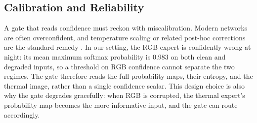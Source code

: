 \subsection{Calibration and Reliability}

A gate that reads confidence must reckon with miscalibration. Modern networks are
often overconfident, and temperature scaling or related post-hoc corrections are the
standard remedy \cite{guo2017calibration}. In our setting, the RGB expert is
confidently wrong at night: its mean maximum softmax probability is 0.983 on both clean
and degraded inputs, so a threshold on RGB confidence cannot separate the two regimes.
The gate therefore reads the full probability maps, their entropy, and the thermal
image, rather than a single confidence scalar. This design choice is also why the gate
degrades gracefully: when RGB is corrupted, the thermal expert's probability map
becomes the more informative input, and the gate can route accordingly.

